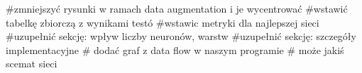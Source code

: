 #zmniejszyć rysunki w ramach data augmentation i je wycentrować
#wstawić tabelkę zbiorczą z wynikami testó
#wstawic metryki dla najlepszej sieci
#uzupełnić sekcję: wpływ liczby neuronów, warstw
#uzupełnić sekcję: szczegóły implementacyjne
# dodać graf z data flow w naszym programie
# może jakiś scemat sieci
